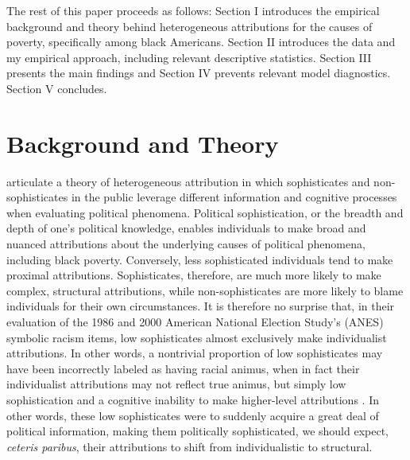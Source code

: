 \documentclass[12pt]{paper}
\begin{document}
The rest of this paper proceeds as follows: Section I introduces the empirical background and theory behind heterogeneous attributions for the causes of poverty, specifically among black Americans. Section II introduces the data and my empirical approach, including relevant descriptive statistics. Section III presents the main findings and Section IV prevents relevant model diagnostics. Section V concludes.



\section{Background and Theory}
\cite{gomez_political_2001, gomez_rethinking_2006} articulate a theory of heterogeneous attribution in which sophisticates and non-sophisticates in the public leverage different information and cognitive processes when evaluating political phenomena. Political sophistication, or the breadth and depth of one's political knowledge, enables individuals to make broad and nuanced attributions about the underlying causes of political phenomena, including black poverty. Conversely, less sophisticated individuals tend to make proximal attributions. Sophisticates, therefore, are much more likely to make complex, structural attributions, while non-sophisticates are more likely to blame individuals for their own circumstances. It is therefore no surprise that, in their evaluation of the 1986 and 2000 American National Election Study's (ANES) symbolic racism items, low sophisticates almost exclusively make individualist attributions. In other words, a nontrivial proportion of low sophisticates may have been incorrectly labeled as having racial animus, when in fact their individualist attributions may not reflect true animus, but simply low sophistication and a cognitive inability to make higher-level attributions \citep{gomez_rethinking_2006}. In other words, these low sophisticates were to suddenly acquire a great deal of political information, making them politically sophisticated, we should expect, \textit{ceteris paribus}, their attributions to shift from individualistic to structural.
\end{document}
